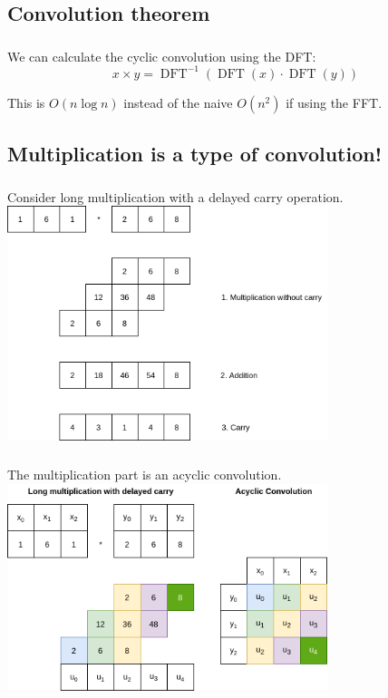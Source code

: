 \documentclass{beamer}
\DeclareMathOperator{\DFT}{DFT}
\begin{document}
\subsection{Convolution theorem}

\begin{frame}
		\frametitle{\secname}
		\framesubtitle{\subsecname}


		We can calculate the cyclic convolution using the DFT:
		\[
				x \times y = \DFT^{-1}(\DFT(x) \cdot \DFT(y))
		\]

		This is $O(n \log n)$ instead of the naive $O(n^2)$ if using the FFT.
\end{frame}

\subsection{Multiplication is a type of convolution!}

\begin{frame}
		\frametitle{\secname}
		\framesubtitle{\subsecname}


		Consider long multiplication with a delayed carry operation.
		\includegraphics[width=0.7\textwidth]{../resources/long_multiplication.drawio.png}
\end{frame}

\begin{frame}
		\frametitle{\secname}
		\framesubtitle{\subsecname}

		The multiplication part is an acyclic convolution.
		\includegraphics[width=0.7\textwidth]{../resources/multiplication_convolution.drawio.png}
\end{frame}
\end{document}
